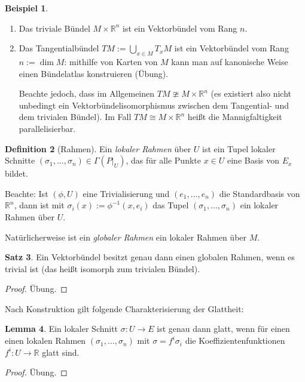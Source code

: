 \documentclass[a4paper]{scrreprt}
\numberwithin{equation}{chapter}
\newcommand{\R}{\mathbb{R}}
\theoremstyle{definition}
\newtheorem{defn}{Definition}[section]
\newtheorem{lemma}[defn]{Lemma}
\newtheorem{satz}[defn]{Satz}
\newtheorem{bsp}[defn]{Beispiel}
\newcommand{\bewUeb}{\begin{proof}Übung.\end{proof}}
\begin{document}
		
		\begin{bsp}\hfill
			\begin{enumerate}
				\item Das triviale Bündel $M\times \R^n$ ist ein Vektorbündel vom Rang $n$.
				\item Das Tangentialbündel $TM:=\bigcup_{x\in M}T_xM$ ist ein Vektorbündel vom Rang $n:=\dim M$: mithilfe von Karten von $M$ kann man auf kanonische Weise einen Bündelatlas konstruieren (Übung).

					Beachte jedoch, dass im Allgemeinen $TM\ncong M\times \R^n$ (es existiert also nicht unbedingt ein Vektorbündelisomorphismus zwischen dem Tangential- und dem trivialen Bündel). Im Fall $TM\cong M\times \R^n$ heißt die Mannigfaltigkeit parallelisierbar.
			\end{enumerate}
		\end{bsp}
		\begin{defn}[Rahmen]
			Ein \emph{lokaler Rahmen} über $U$ ist ein Tupel lokaler Schnitte $(\sigma_1,\ldots,\sigma_n)\in\Gamma(P\vert_U)$, das für alle Punkte $x\in U$ eine Basis von $E_x$ bildet. 
			
			Beachte: Ist $(\phi,U)$ eine Trivialisierung und $(e_1,\ldots,e_n)$ die Standardbasis von $\R^n$, dann ist mit $\sigma_i(x):=\phi^{-1}(x,e_i)$ das Tupel $(\sigma_1,\ldots,\sigma_n)$ ein lokaler Rahmen über $U$.
			
			Natürlicherweise ist ein \emph{globaler Rahmen} ein lokaler Rahmen über $M$.
		\end{defn}
		\begin{satz}
			Ein Vektorbündel besitzt genau dann einen globalen Rahmen, wenn es trivial ist (das heißt isomorph zum trivialen Bündel).
			\bewUeb
		\end{satz}
		Nach Konstruktion gilt folgende Charakterisierung der Glattheit:
		\begin{lemma} \label{lemma:schnitt_glatt_koeff_glatt}
			Ein lokaler Schnitt $\sigma\colon U\rightarrow E$ ist genau dann glatt, wenn für einen einen lokalen Rahmen $(\sigma_1,\ldots,\sigma_n)$ mit $\sigma=f^i\sigma_i$ die Koeffizientenfunktionen $f^i\colon U\rightarrow \R$ glatt sind.
			\bewUeb
		\end{lemma}
		
\end{document}
